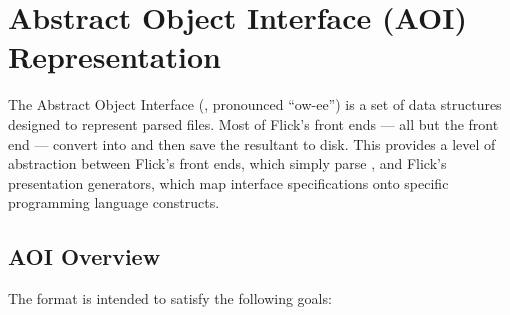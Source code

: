 

\chapter{Abstract Object Interface (AOI) Representation}
\label{cha:AOI}

The Abstract Object Interface (\AOI{}, pronounced ``ow-ee'') is a set of data
structures designed to represent parsed \IDL{} files.  Most of Flick's front
ends --- all but the \MIG{} front end --- convert \IDL{} into \AOI{} and then
save the resultant \AOI{} to disk.  This provides a level of abstraction
between Flick's front ends, which simply parse \IDL{}, and Flick's presentation
generators, which map interface specifications onto specific programming
language constructs.



\section{AOI Overview}
\label{sec:AOI:AOI Overview}

The \AOI{} format is intended to satisfy the following goals:

